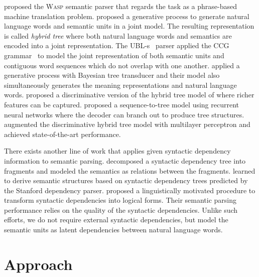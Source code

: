 \citet{wong2006learning} proposed the \textsc{Wasp} semantic parser 
that regards the task as a phrase-based machine translation problem.
\citet{lu2008generative} proposed a generative process to generate natural language words and semantic units in a joint model. 
The resulting representation is called \textit{hybrid tree} where both natural language words and semantics are encoded into a joint representation. 
The \textsc{UBL}-s~\cite{kwiatkowski2010inducing} parser applied the CCG grammar~\cite{steedman1996surface} to model the joint representation of both semantic units and contiguous word sequences which do not overlap with one another. 
\citet{jones2012semantic} applied a generative process with Bayesian tree transducer and their model also simultaneously generates the meaning representations and natural language words. 
\citet{lu2014semantic,lu2015constrained} proposed a discriminative version of the hybrid tree model of \cite{lu2008generative} where richer features can be captured. 
\citet{dong2016language} proposed a sequence-to-tree model using recurrent neural networks where the decoder can branch out to produce tree structures. 
\citet{susanto2017semantic} augmented the discriminative {hybrid tree} model with multilayer perceptron and achieved state-of-the-art performance. 




There exists another line of work that applies given syntactic dependency information to semantic parsing. 
\citet{titov2011bayesian} decomposed a syntactic dependency tree into fragments and modeled the semantics as relations between the fragments. 
\citet{poon2013grounded} learned to derive semantic structures based on syntactic dependency trees predicted by the Stanford dependency parser.
\citet{reddy2016transforming,reddy2017universal} proposed a linguistically motivated procedure to transform syntactic dependencies into logical forms. 
Their semantic parsing performance relies on the quality of the syntactic dependencies.
Unlike such efforts, we do not require external syntactic dependencies, but model the semantic units as latent dependencies between natural language words. 

\section{Approach}

